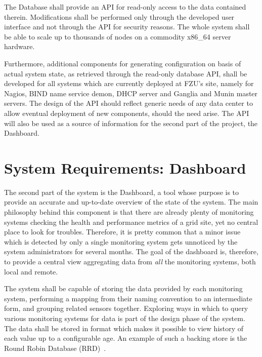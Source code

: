 \documentclass[12pt]{article}
\begin{document}
The Database shall provide an API for read-only access to the data contained therein.  Modifications shall be performed only
through the developed user interface and not through the API for security reasons.  The whole system shall be able to scale up to
thousands of nodes on a commodity x86\_64 server hardware.

Furthermore, additional components for generating configuration on basis of actual system state, as retrieved through the
read-only database API, shall be developed for all systems which are currently deployed at FZU's site, namely for Nagios, BIND
name service demon, DHCP server and Ganglia and Munin master servers.  The design of the API should reflect generic needs of any
data center to allow eventual deployment of new components, should the need arise.  The API will also be used as a source of
information for the second part of the project, the Dashboard.

\section{System Requirements: Dashboard}

The second part of the system is the Dashboard, a tool whose purpose is to provide an accurate and up-to-date overview of the
state of the system.  The main philosophy behind this component is that there are already plenty of monitoring systems checking
the health and performance metrics of a grid site, yet no central place to look for troubles.  Therefore, it is pretty common that
a minor issue which is detected by only a single monitoring system gets unnoticed by the system administrators for several months.
The goal of the dashboard is, therefore, to provide a central view aggregating data from {\em all} the monitoring systems, both
local and remote.

The system shall be capable of storing the data provided by each monitoring system, performing a mapping from their naming
convention to an intermediate form, and grouping related sensors together.  Exploring ways in which to query various monitoring
systems for data is part of the design phase of the system.  The data shall be stored in format which makes it possible to view
history of each value up to a configurable age.  An example of such a backing store is the Round Robin Database (RRD)~\cite{rrd}.
\end{document}
